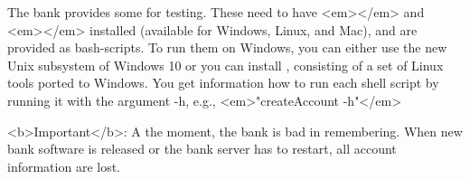 The bank provides some  for testing. These need to have <em></em> and <em></em> installed (available for Windows, Linux, and Mac), and are provided as bash-scripts. To run them on Windows, you can either use the new Unix subsystem of Windows 10 or you can install , consisting of a set of Linux tools ported to Windows. You get information how to run each shell script by running it with the argument -h, e.g., <em>"createAccount -h"</em>

<b>Important</b>: A the moment, the bank is bad in remembering. When new bank software is released or the bank server has to restart, all account information are lost.


